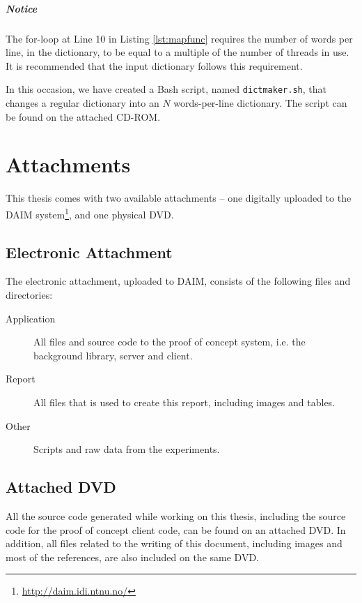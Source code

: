 \documentclass[pdftex,english,10pt,b5paper,twoside]{book}
\begin{document}
\paragraph{Notice} The for-loop at Line 10 in Listing \ref{lst:mapfunc}
requires the number of words per line, in the dictionary, to be equal to a
multiple of the number of threads in use. It is recommended that the input
dictionary follows this requirement. 

In this occasion, we have created a Bash script, named \texttt{dictmaker.sh},
that changes a regular dictionary into an $N$ words-per-line dictionary. The
script can be found on the attached CD-ROM.

\chapter{Attachments}

This thesis comes with two available attachments -- one digitally uploaded to
the DAIM system\footnote{\url{http://daim.idi.ntnu.no/}}, and one physical DVD.

\section{Electronic Attachment}

The electronic attachment, uploaded to
DAIM, consists of the following files
and directories:

\begin{description}
  \item[Application] All files and source code to the proof of concept system,
    i.e. the background library, server and client.
  \item[Report] All files that is used to create this report, including images
    and tables.
  \item[Other] Scripts and raw data from the experiments.
\end{description}

\section{Attached DVD}

All the source code generated while working on this thesis, including the
source code for the proof of concept client code, can be found on an attached
DVD. In addition, all files related to the writing of this document, including
images and most of the references, are also included on the same DVD.
\end{document}
